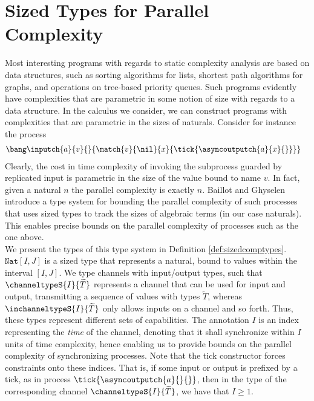 \section{Sized Types for Parallel Complexity}\label{sec:b&gts}
%
%
Most interesting programs with regards to static complexity analysis are based on data structures, such as sorting algorithms for lists, shortest path algorithms for graphs, and operations on tree-based priority queues. Such programs evidently have complexities that are parametric in some notion of size with regards to a data structure. In the calculus we consider, we can construct programs with complexities that are parametric in the sizes of naturals. Consider for instance the process
\begin{align*}
    &\kern0em\bang\inputch{a}{v}{}{\match{v}{\nil}{x}{\tick{\asyncoutputch{a}{x}{}}}}
\end{align*}
Clearly, the cost in time complexity of invoking the subprocess guarded by replicated input is parametric in the size of the value bound to name $v$. In fact, given a natural $n$ the parallel complexity is exactly $n$. Baillot and Ghyselen \cite{BaillotGhyselen2021} introduce a type system for bounding the parallel complexity of such processes that uses sized types to track the sizes of algebraic terms (in our case naturals). This enables precise bounds on the parallel complexity of processes such as the one above.\\

We present the types of this type system in Definition \ref{def:sizedcomptypes}. $\texttt{Nat}[I,J]$ is a sized type that represents a natural, bound to values within the interval $[I,J]$. We type channels with input/output types, such that $\channeltypeS{I}{\widetilde{T}}$ represents a channel that can be used for input and output, transmitting a sequence of values with types $\widetilde{T}$, whereas $\inchanneltypeS{I}{\widetilde{T}}$ only allows inputs on a channel and so forth. Thus, these types represent different sets of capabilities. The annotation $I$ is an index representing the \textit{time} of the channel, denoting that it shall synchronize within $I$ units of time complexity, hence enabling us to provide bounds on the parallel complexity of synchronizing processes. Note that the tick constructor forces constraints onto these indices. That is, if some input or output is prefixed by a tick, as in process $\tick{\asyncoutputch{a}{}{}}$, then in the type of the corresponding channel $\channeltypeS{I}{\widetilde{T}}$, we have that $I \geq 1$.


